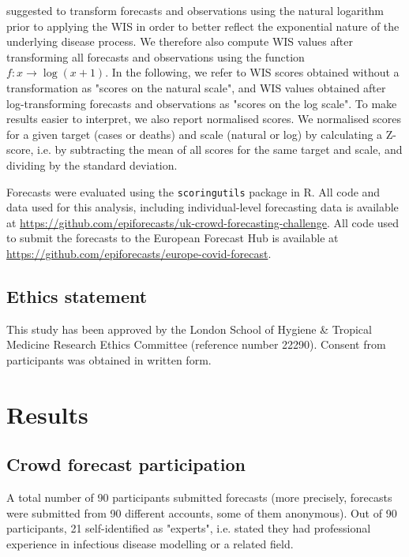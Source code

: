 \documentclass[10pt,a4paper,twocolumn]{article}
\begin{document}
\citet{bosseTransformationForecastsEvaluating2023} suggested to transform forecasts and observations using the natural logarithm prior to applying the WIS in order to better reflect the exponential nature of the underlying disease process. We therefore also compute WIS values after transforming all forecasts and observations using the function $f\colon x \to \log (x + 1)$. In the following, we refer to WIS scores obtained without a transformation as "scores on the natural scale", and WIS values obtained after log-transforming forecasts and observations as "scores on the log scale". To make results easier to interpret, we also report normalised scores. We normalised scores for a given target (cases or deaths) and scale (natural or log) by calculating a Z-score, i.e. by subtracting the mean of all scores for the same target and scale, and dividing by the standard deviation. 

Forecasts were evaluated using the \texttt{scoringutils} \citep{bosseEvaluatingForecastsScoringutils2022} package in \textsf{R}. All code and data used for this analysis, including individual-level forecasting data is available at \url{https://github.com/epiforecasts/uk-crowd-forecasting-challenge}. All code used to submit the forecasts to the European Forecast Hub is available at \url{https://github.com/epiforecasts/europe-covid-forecast}. 

\subsection*{Ethics statement}
This study has been approved by the London School of Hygiene \& Tropical Medicine Research Ethics Committee (reference number 22290). Consent from participants was obtained in written form.



\section*{Results}

\subsection*{Crowd forecast participation}

A total number of 90 participants submitted forecasts (more precisely, forecasts were submitted from 90 different accounts, some of them anonymous). Out of 90 participants, 21 self-identified as "experts", i.e. stated they had professional experience in infectious disease modelling or a related field. 
\end{document}
